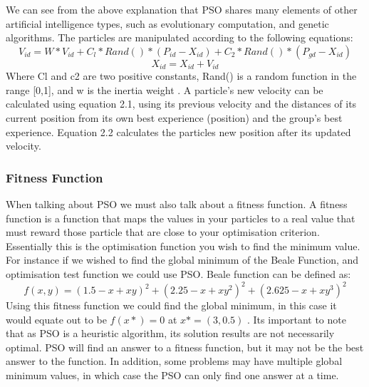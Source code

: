 \documentclass[oneside,12pt]{book}
\begin{document}
We can see from the above explanation that PSO shares many elements of other artificial intelligence types, such as evolutionary computation, and genetic algorithms. The particles are manipulated according to the following equations: 
\begin{equation}
V_{id} = W * V_{id} + C_l * Rand( ) * ( P_{id} - X_{id} ) + C_2 * Rand( ) * (P_{gd} - X_{id})
\end{equation}
\begin{equation}
X_{id} = X_{id} + V_{id}
\end{equation}
Where Cl and c2 are two positive constants, Rand() is a random function in the range [0,1], and w is the inertia weight \cite{shi1998parameter}. A particle's new velocity can be calculated using equation 2.1, using its previous velocity and the distances of its current position from its own best experience (position) and the group's best experience. Equation 2.2 calculates the particles new position after its updated velocity. 

\subsubsection{Fitness Function}
When talking about PSO we must also talk about a fitness function. A fitness function is a function that maps the values in your particles to a real value that must reward those particle that are close to your optimisation criterion. Essentially this is the optimisation function you wish to find the minimum value. For instance if we wished to find the global minimum of the Beale Function, and optimisation test function we could use PSO. Beale function can be defined as:
\begin{equation}
f(x, y) = (1.5-x+xy)^2+(2.25-x+xy^2)^2+(2.625-x+xy^3)^2
\end{equation}
Using this fitness function we could find the global minimum, in this case it would equate out to be $f(x*)=0$ at $x*=(3,0.5)$ \cite{bingham}. Its important to note that as PSO is a heuristic algorithm, its solution results are not necessarily optimal. PSO will find an answer to a fitness function, but it may not be the best answer to the function. In addition, some problems may have multiple global minimum values, in which case the PSO can only find one answer at a time.
\end{document}
